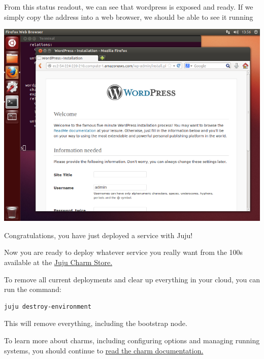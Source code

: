 \documentclass[letterpaper,10pt,english]{sphinxmanual}
\begin{document}
From this status readout, we can see that wordpress is exposed and
ready. If we simply copy the address into a web browser, we should be
able to see it running

\includegraphics{getting_started-wordpress.png}

Congratulations, you have just deployed a service with Juju!

Now you are ready to deploy whatever service you really want from the
100s available at the \href{http://jujucharms.com}{Juju Charm Store.}

To remove all current deployments and clear up everything in your
cloud, you can run the command:

\begin{Verbatim}[commandchars=\\\{\}]
juju destroy-environment
\end{Verbatim}

This will remove everything, including the bootstrap node.

To learn more about charms, including configuring options and managing
running systems, you should continue to \href{https://juju.ubuntu.com/./charms.html}{read the charm
documentation.}



\renewcommand{\indexname}{Index}
\printindex
\end{document}
